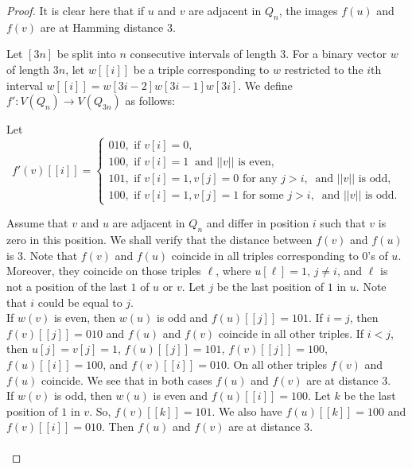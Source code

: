 \documentclass[11pt, a4paper]{article}
\begin{document}
\begin{proof}
It is clear here that if $u$ and $v$ are adjacent in $Q_n$, the images $f(u)$ and $f(v)$ are at Hamming distance $3$.
		
	
\vskip 1cm	

Let $[3n]$ be split into $n$ consecutive intervals of length $3$.  For a binary vector $w$ of length $3n$, let $w[[i]]$ be a triple corresponding to $w$ restricted to the $i$th interval  $w[[i]]= w[3i-2] w[3i-1] w[3i]$.  We define $f':V(Q_n)\rightarrow V(Q_{3n})$ as follows:


Let 
\begin{equation} \nonumber
f'(v)[[i]] = \begin{cases}
010,  \mbox{ if }  v[i]=0, \\
100,  \mbox{ if }  v[i]=1 ~ \mbox{ and   } ||v|| \mbox{ is even}, \\
101,  \mbox{ if }  v[i]=1,  v[j]=0 \mbox{ for any } j>i, ~ \mbox{ and   } ||v|| \mbox{ is odd},\\
100,  \mbox{ if }  v[i]=1,  v[j]=1 \mbox{ for some } j>i, ~ \mbox{ and   } ||v|| \mbox{ is odd}.
\end{cases}
\end{equation}		
		
Assume that $v$ and $u$ are adjacent in $Q_n$ and differ in position $i$ such that $v$ is zero in this position.
We shall verify that the distance between $f(v)$ and $f(u)$ is $3$.
Note that $f(v)$ and $f(u)$ coincide in all triples corresponding to $0$'s of $u$. Moreover, they coincide on those triples $\ell$, where $u[\ell]=1$, $j\neq i$, and $\ell$ is not a position of the last $1$ of $u$ or $v$.  Let $j$ be the last position of $1$ in $u$. Note that $i$ could be equal to $j$.  \\

If $w(v)$ is even, then $w(u)$ is odd and $f(u)[[j]]=101$. If $i=j$, then $f(v)[[j]]=010$ and $f(u)$ and $f(v)$ coincide in all other triples.  If $i<j$,  then $u[j]=v[j] =1$, $f(u)[[j]]=101$, $f(v)[[j]]=100$, 
$f(u)[[i]]=100$, and $f(v)[[i]]=010$. On all other triples $f(v)$ and $f(u)$ coincide. We see that in both cases $f(u)$ and $f(v)$ are at distance $3$.\\

If $w(v)$ is odd, then $w(u)$ is even and $f(u)[[i]]=100$. 
Let $k$ be the last position of $1$ in $v$. So, $f(v)[[k]]= 101$. 
We also have $f(u)[[k]]=100$ and $f(v)[[i]]= 010$. Then $f(u)$ and $f(v)$ are at distance $3$.\\~\\



\end{proof}
\end{document}
